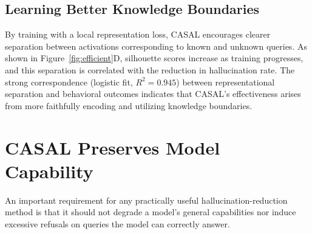 \subsection{Learning Better Knowledge Boundaries}

By training with a local representation loss, CASAL encourages clearer separation between activations corresponding to known and unknown queries. As shown in Figure~\ref{fig:efficient}D, silhouette scores increase as training progresses, and this separation is correlated with the reduction in hallucination rate. The strong correspondence (logistic fit, $R^2 = 0.945$) between representational separation and behavioral outcomes indicates that CASAL's effectiveness arises from more faithfully encoding and utilizing knowledge boundaries.

\section{CASAL Preserves Model Capability}

An important requirement for any practically useful hallucination-reduction method is that it should not degrade a model's general capabilities nor induce excessive refusals on queries the model can correctly answer.

\begin{table}[htbp]
\centering
\small
{}
\caption[CASAL does not introduce over-refusal on known queries]{CASAL does not introduce over-refusal nor degrade performance for  queries. Refusal rate and accuracy across three different QA datasets are measured.}
\label{tab:over_refusal}
\end{table}

